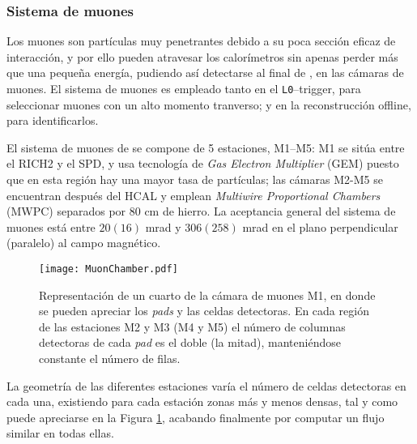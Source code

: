 
\subsubsection{Sistema de muones} %

Los muones son partículas muy penetrantes debido a su poca sección eficaz de interacción, y por ello pueden atravesar los calorímetros sin apenas perder más que una pequeña energía, pudiendo así detectarse al final de \lhcb, en las cámaras de muones. \color{new} El sistema de muones es empleado tanto en el \texttt{L0}--trigger, para seleccionar muones con un alto momento tranverso; y en la reconstrucción offline, para identificarlos. \color{norm}

El sistema de muones de \lhcb \cite{Alves:1129809} se compone de 5 estaciones, M1--M5: M1 se sitúa entre el RICH2 y el SPD, y usa tecnología de \emph{Gas Electron Multiplier} (GEM) puesto que en esta región hay una mayor tasa de partículas; las cámaras M2-M5 se encuentran después del HCAL y emplean \emph{Multiwire Proportional Chambers} (MWPC) \color{new} separados por $80$ cm de hierro. La aceptancia general del sistema de muones está entre $20 (16)$ mrad y $306 (258)$ mrad en el plano perpendicular (paralelo) al campo magnético. \color{norm}

\begin{figure}[H]
\centering
\texttt{[image: MuonChamber.pdf]}
\caption{Representación de un cuarto de la cámara de muones M1, en donde se pueden apreciar los \emph{pads} y las celdas detectoras. En cada región de las estaciones M2 y M3 (M4 y M5) el número de columnas detectoras de cada \emph{pad} es el doble (la mitad), manteniéndose constante el número de filas.}	\label{fig_muonchambers}
\end{figure}

La geometría de las diferentes estaciones varía el número de celdas detectoras en cada una, existiendo para cada estación zonas más y menos densas, tal y como puede apreciarse en la Figura \ref{fig_muonchambers}, acabando finalmente por computar un flujo similar en todas ellas.





